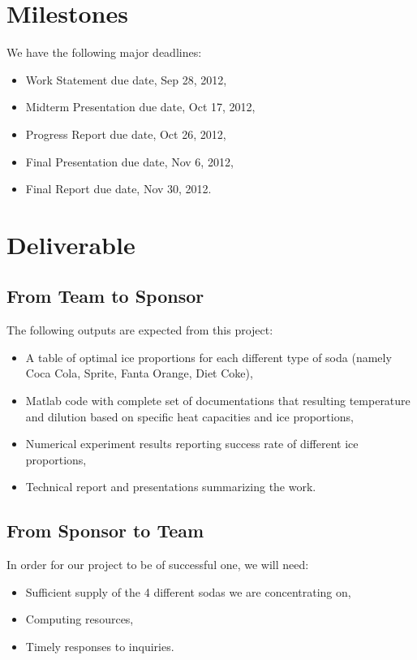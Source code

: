 \documentclass[12pt,letterpaper]{article}
\theoremstyle{definition}
\begin{document}
\section{Milestones}
We have the following major deadlines:
\begin{itemize}
    \item Work Statement due date, Sep 28, 2012,
    \item Midterm Presentation due date, Oct 17, 2012,
    \item Progress Report due date, Oct 26, 2012,
    \item Final Presentation due date, Nov 6, 2012,
    \item Final Report due date, Nov 30, 2012.
\end{itemize}

\section{Deliverable}
\subsection{From Team to Sponsor} %
The following outputs are expected from this project:
\begin{itemize}
    \item A table of optimal ice proportions for each different type of soda (namely Coca Cola, Sprite, Fanta Orange, Diet Coke),
    \item Matlab code with complete set of documentations that resulting temperature and dilution based on specific heat capacities and ice proportions,
    \item Numerical experiment results reporting success rate of different ice proportions,
    \item Technical report and presentations summarizing the work. 
\end{itemize}

\subsection{From Sponsor to Team} %

In order for our project to be of successful one, we will need:
\begin{itemize}
    \item Sufficient supply of the 4 different sodas we are concentrating on,
    \item Computing resources,
    \item Timely responses to inquiries.
\end{itemize}

%
%
\end{document}
